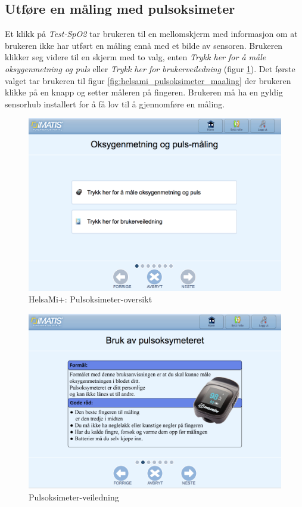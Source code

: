 \subsection{Utføre en måling med pulsoksimeter}
Et klikk på \textit{Test-SpO2} tar brukeren til en mellomskjerm med informasjon om at
brukeren ikke har utført en måling ennå med et bilde av sensoren. Brukeren klikker seg videre
til en skjerm med to valg, enten \textit{Trykk her for å måle oksygenmetning og puls} eller \textit{Trykk her for brukerveiledning}
(figur \ref{fig:helsami_pulsoksimeter_oversikt}). Det første valget tar brukeren til figur \ref{fig:helsami_pulsoksimeter_maaling}
der brukeren klikke på en knapp og setter måleren på fingeren. Brukeren må ha en gyldig sensorhub installert for
å få lov til å gjennomføre en måling.

\begin{figure}
\includegraphics[width=1.0\textwidth,center]{fig/helsami/pulsoksimeter_oversikt}
\caption{HelsaMi+: Pulsoksimeter-oversikt}
\label{fig:helsami_pulsoksimeter_oversikt}
\end{figure}

\begin{figure}
\includegraphics[width=1.0\textwidth,center]{fig/helsami/pulsoksimeter_veiledning}
\caption{Pulsoksimeter-veiledning}
\label{fig:helsami_pulsoksimeter_veiledning}
\end{figure}

